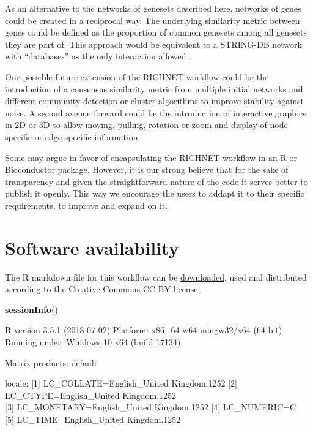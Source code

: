 \documentclass[9pt,a4paper,]{extarticle}
\newenvironment{Shaded}{\begin{snugshade}}{\end{snugshade}}
\newcommand{\KeywordTok}[1]{\textcolor[rgb]{0.13,0.29,0.53}{\textbf{#1}}}
\newcommand{\NormalTok}[1]{#1}
\theoremstyle{definition}
\theoremstyle{definition}
\theoremstyle{definition}
\theoremstyle{remark}
\begin{document}
As an alternative to the networks of genesets described here, networks of genes could be created in a reciprocal way. The underlying similarity metric between genes could be defined as the proportion of common genesets among all genesets they are part of. This approach would be equivalent to a STRING-DB network with ``databases'' as the only interaction allowed \citep{Szklarczyk2017}.

One possible future extension of the RICHNET workflow could be the introduction of a consensus similarity metric from multiple initial networks and different community detection or cluster algorithms to improve stability against noise. A second avenue forward could be the introduction of interactive graphics in 2D or 3D \citep{Ognyanova2015} to allow moving, pulling, rotation or zoom and display of node specific or edge specific information.

Some may argue in favor of encapsulating the RICHNET workflow in an R or Bioconductor package. However, it is our strong believe that for the sake of transparency and given the straightforward nature of the code it serves better to publish it openly. This way we encourage the users to addapt it to their specific requirements, to improve and expand on it.

\section{Software availability}\label{software-availability}

The R markdown file for this workflow can be \href{https://gitlab.ethz.ch/nexuscbu/richnet/tree/master/RICHNET_ms.Rmd}{downloaded}, used and distributed according to the \href{https://creativecommons.org/licenses/by/4.0/}{Creative Commons CC BY license}.

\newpage 

\begin{Shaded}
\begin{Highlighting}[]
\KeywordTok{sessionInfo}\NormalTok{()}
\end{Highlighting}
\end{Shaded}

R version 3.5.1 (2018-07-02)
Platform: x86\_64-w64-mingw32/x64 (64-bit)
Running under: Windows 10 x64 (build 17134)

Matrix products: default

locale:
{[}1{]} LC\_COLLATE=English\_United Kingdom.1252
{[}2{]} LC\_CTYPE=English\_United Kingdom.1252\\
{[}3{]} LC\_MONETARY=English\_United Kingdom.1252
{[}4{]} LC\_NUMERIC=C\\
{[}5{]} LC\_TIME=English\_United Kingdom.1252
\end{document}
